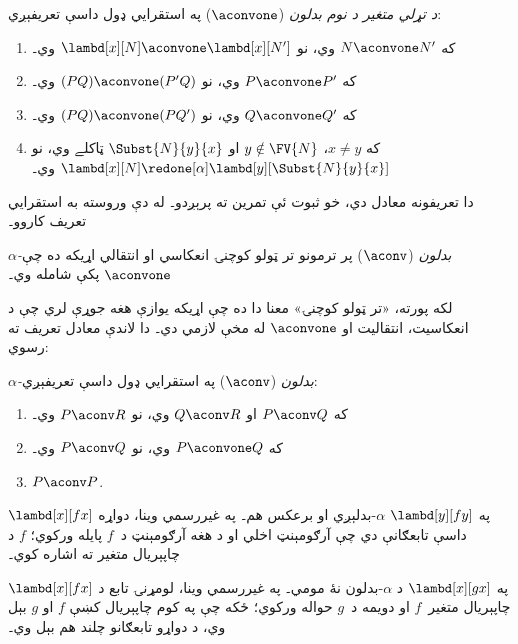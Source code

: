 \documentclass[../../../include/open-logic-section]{subfiles}
\begin{document}
\begin{defn} 
  \emph{د تړلي متغير د نوم بدلون} ($\aconvone$) په استقرايي
  ډول داسې تعريفېږي:
  \begin{enumerate}
  \item که $N \aconvone N'$ وي، نو $\lambd[x][N] \aconvone
    \lambd[x][N']$ وي۔ 
  \item که $P \aconvone P'$ وي، نو $(PQ) \aconvone (P'Q)$ وي۔ 
  \item که $Q \aconvone Q'$ وي، نو $(PQ) \aconvone (PQ')$ وي۔ 
  \item که $x \neq y$، $y \notin \FV{N}$ او $\Subst{N}{y}{x}$
    ټاکلے وي، نو
    $\lambd[x][N] \redone[\alpha] \lambd[y][\Subst{N}{y}{x}]$ وي۔
  \end{enumerate}
\end{defn}

دا تعريفونه معادل دي، خو ثبوت ئې تمرين ته پرېږدو۔ له دې وروسته
به استقرايي تعريف کاروو۔

\begin{defn}
  \emph{$\alpha$-بدلون} ($\aconv$) پر ترمونو تر ټولو کوچنۍ
  انعکاسي او انتقالي اړيکه ده چې $\aconvone$ پکې شامله وي۔
\end{defn}

لکه پورته، «تر ټولو کوچنۍ» معنا دا ده چې اړيکه يوازې هغه جوړې
لري چې د انعکاسيت، انتقاليت او $\aconvone$ له مخې لازمي دي۔
دا لاندې معادل تعريف ته رسوي:

\begin{defn} 
  \emph{$\alpha$-بدلون} ($\aconv$) په استقرايي ډول داسې
  تعريفېږي:
  \begin{enumerate}
  \item که $P \aconv Q$ او $Q \aconv R$ وي، نو $P \aconv R$ وي۔
  \item که $P \aconvone Q$ وي، نو $P \aconv Q$ وي۔ 
  \item $P \aconv P$. 
  \end{enumerate}
\end{defn}

\begin{ex}
  $\lambd[x][f x]$ په $\lambd[y][f
  y]$ $\alpha$-بدلېږي او برعکس هم۔ په غيررسمي وينا، دواړه داسې تابعګانې
  دي چې آرګومېنټ اخلي او د هغه آرګومېنټ د~$f$ پايله ورکوي؛
  $f$ د چاپېريال متغير ته اشاره کوي۔

  $\lambd[x][f x]$ په $\lambd[x][g
    x]$ د $\alpha$-بدلون نۀ مومي۔ په غيررسمي وينا، لومړنۍ تابع د چاپېريال
  متغير~$f$ او دويمه د~$g$ حواله ورکوي؛ ځکه چې په کوم چاپېريال
  کښې $f$ او $g$ بېل وي، د دواړو تابعګانو چلند هم بېل وي۔
\end{ex}
\end{document}
